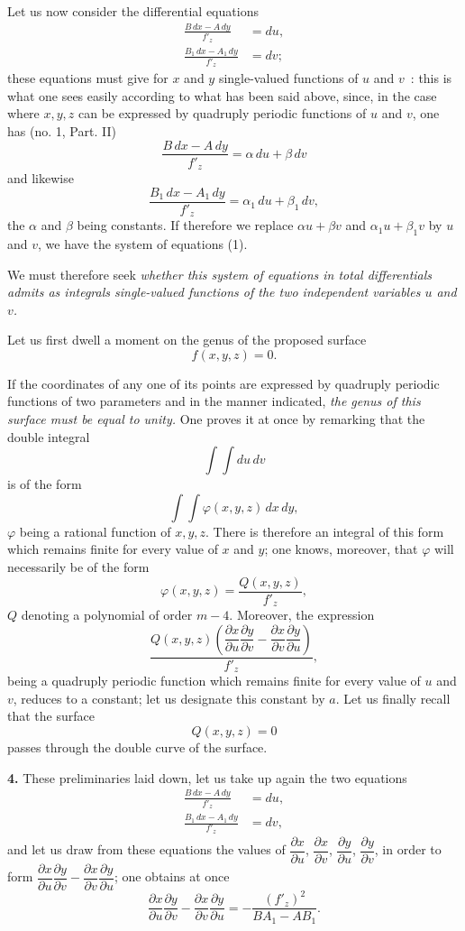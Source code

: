 \documentclass{article}
\begin{document}
Let us now consider the differential equations
\[
\begin{aligned}
\frac{B\,dx - A\,dy}{f'_{z}} &= du, \\
\frac{B_{1}\,dx - A_{1}\,dy}{f'_{z}} &= dv;
\end{aligned}
\tag{1}
\]
these equations must give for $x$ and $y$ single-valued functions of
$u$ and $v$~: this is what one sees easily according to what has been said above, since, in the case where $x, y, z$ can be expressed by quadruply periodic functions of $u$ and $v$, one has (no. 1, Part. II)
\[
\frac{B\,dx - A\,dy}{f'_{z}} = \alpha\,du + \beta\,dv
\]
and likewise
\[
\frac{B_{1}\,dx - A_{1}\,dy}{f'_{z}} = \alpha_{1}\,du + \beta_{1}\,dv,
\]
the $\alpha$ and $\beta$ being constants. If therefore we replace $\alpha u + \beta v$ and $\alpha_{1} u + \beta_{1} v$ by $u$ and $v$, we have the system of equations (1).

We must therefore seek \emph{whether this system of equations in total differentials admits as integrals single-valued functions of the two independent variables $u$ and $v$.}

Let us first dwell a moment on the genus of the proposed surface
\[
f(x, y, z) = 0.
\]

If the coordinates of any one of its points are expressed by quadruply periodic functions of two parameters and in the manner indicated, \emph{the genus of this surface must be equal to unity.} One proves it at once by remarking that the double integral
\[
\int \int du\,dv
\]
is of the form
\[
\int \int \varphi(x, y, z)\,dx\,dy,
\]
$\varphi$ being a rational function of $x, y, z$. There is therefore an integral of this form which remains finite for every value of $x$ and $y$; one knows, moreover, that $\varphi$ will necessarily be of the form
\[
\varphi(x, y, z) = \frac{Q(x, y, z)}{f'_{z}},
\]
$Q$ denoting a polynomial of order $m - 4$. Moreover, the expression
\[
\frac{Q(x, y, z)\left(\dfrac{\partial x}{\partial u} \dfrac{\partial y}{\partial v} - \dfrac{\partial x}{\partial v} \dfrac{\partial y}{\partial u}\right)}{f'_{z}},
\]
being a quadruply periodic function which remains finite for every value of $u$ and $v$, reduces to a constant; let us designate this constant by $a$. Let us finally recall that the surface
\[
Q(x, y, z) = 0
\]
passes through the double curve of the surface.

\textbf{4.} These preliminaries laid down, let us take up again the two equations
\[
\begin{aligned}
\frac{B\,dx - A\,dy}{f'_{z}} &= du, \\
\frac{B_{1}\,dx - A_{1}\,dy}{f'_{z}} &= dv,
\end{aligned}
\]
and let us draw from these equations the values of $\dfrac{\partial x}{\partial u}$, $\dfrac{\partial x}{\partial v}$, $\dfrac{\partial y}{\partial u}$, $\dfrac{\partial y}{\partial v}$, in order to form $\dfrac{\partial x}{\partial u} \dfrac{\partial y}{\partial v} - \dfrac{\partial x}{\partial v} \dfrac{\partial y}{\partial u}$; one obtains at once
\[
\frac{\partial x}{\partial u} \frac{\partial y}{\partial v} - \frac{\partial x}{\partial v} \frac{\partial y}{\partial u} = -\frac{(f'_{z})^{2}}{BA_{1} - AB_{1}}.
\]
\end{document}
